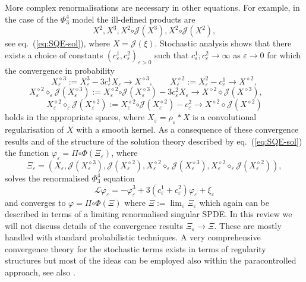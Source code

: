 \documentclass[a4paper, 11pt]{article}
\newcommand{\assign}{:=}
\newcommand{\LL}{\mathcal{L}}
\newcommand{\reso}{\mathord{\circ}}
\begin{document}
More complex renormalisations are necessary in other equations. For example,
in the case of the $\Phi^4_3$ model the ill-defined products are
\[ X^2, X^3, X^2 \reso \mathcal{J}\! (X^3), X^2 \reso \mathcal{J}\! (X^2), \]
see eq.~(\ref{eq:SQE-sol}), where $X =\mathcal{J}\! (\xi)$. Stochastic analysis
shows that there exists a choice of constants $(c_{\varepsilon}^1,
c^2_{\varepsilon})_{\varepsilon > 0}$ such that $c_{\varepsilon}^1,
c_{\varepsilon}^2 \rightarrow \infty$ as $\varepsilon \rightarrow 0$ for which
the convergence in probability
\[ X^{\diamond 3}_{\varepsilon} \assign X^3_{\varepsilon} - 3
   c_{\varepsilon}^1 X_{\varepsilon} \rightarrow X^{\diamond 3}, \qquad
   X^{\diamond 2}_{\varepsilon} \assign X^2_{\varepsilon} - c_{\varepsilon}^1
   \rightarrow X^{\diamond 2}, \]
\[ X^{\diamond 2}_{\varepsilon} \diamond_{\varepsilon} \mathcal{J}\!
   (X^{\diamond 3}_{\varepsilon}) \assign X^{\diamond 2}_{\varepsilon} \reso
   \mathcal{J}\! (X^{\diamond 3}_{\varepsilon}) - 3 c_{\varepsilon}^2
   X_{\varepsilon} \rightarrow X^{\diamond 2} \diamond \mathcal{J}\!
   (X^{\diamond 3}), \qquad \]
\[ X^{\diamond 2}_{\varepsilon} \diamond_{\varepsilon} \mathcal{J}\!
   (X^{\diamond 2}_{\varepsilon}) \assign X^{\diamond 2}_{\varepsilon} \reso
   \mathcal{J}\! (X^{\diamond 2}_{\varepsilon}) - c_{\varepsilon}^2 \rightarrow
   X^{\diamond 2} \diamond \mathcal{J}\! (X^{\diamond 2}) \]
holds in the appropriate spaces, where $X_{\varepsilon} = \rho_{\varepsilon}
\ast X$ is a convolutional regularisation of $X$ with a smooth kernel. As a
consequence of these convergence results and of the structure of the solution
theory described by eq.~(\ref{eq:SQE-sol}) the function $\varphi_{\varepsilon}
= \Pi \reso \Phi (\Xi_{\varepsilon})$, where
\[ \Xi_{\varepsilon} = (X_{\varepsilon}, \mathcal{J}\! (X^{\diamond
   3}_{\varepsilon}), \mathcal{J}\! (X^{\diamond 2}_{\varepsilon}), X^{\diamond
   2}_{\varepsilon} \diamond_{\varepsilon} \mathcal{J}\! (X^{\diamond
   3}_{\varepsilon}), X^{\diamond 2}_{\varepsilon} \diamond_{\varepsilon}
   \mathcal{J}\! (X^{\diamond 2}_{\varepsilon})), \]
solves the renormalised $\Phi^4_3$ equation
\[ \LL \varphi_{\varepsilon} = - \varphi_{\varepsilon}^3 + 3(c^1_{\varepsilon} +
   c^2_{\varepsilon}) \varphi_{\varepsilon} + \xi_{\varepsilon} \]
and converges to $\varphi = \Pi \reso \Phi (\Xi)$
where $\Xi \assign \lim_{\varepsilon} \Xi_{\varepsilon}$ which again can be
described in terms of a limiting renormalised singular SPDE. In this review we
will not discuss details of the convergence results $\Xi_{\varepsilon}
\rightarrow \Xi$. These are mostly handled with standard probabilistic
techniques. A very comprehensive convergence theory for the stochastic terms
exists in terms of regularity structures \cite{bruned_algebraic_2016, chandra_analytic_2016} but most of the ideas can
be employed also within the paracontrolled approach, see also \cite{mourrat_construction_2016}.
\end{document}
